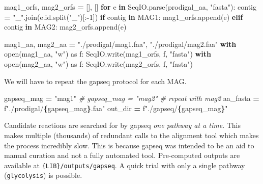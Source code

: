 \documentclass[
]{book}
\newenvironment{Shaded}{\begin{snugshade}}{\end{snugshade}}
\newcommand{\BuiltInTok}[1]{#1}
\newcommand{\CommentTok}[1]{\textcolor[rgb]{0.56,0.35,0.01}{\textit{#1}}}
\newcommand{\ControlFlowTok}[1]{\textcolor[rgb]{0.13,0.29,0.53}{\textbf{#1}}}
\newcommand{\DecValTok}[1]{\textcolor[rgb]{0.00,0.00,0.81}{#1}}
\newcommand{\ImportTok}[1]{#1}
\newcommand{\KeywordTok}[1]{\textcolor[rgb]{0.13,0.29,0.53}{\textbf{#1}}}
\newcommand{\NormalTok}[1]{#1}
\newcommand{\OperatorTok}[1]{\textcolor[rgb]{0.81,0.36,0.00}{\textbf{#1}}}
\newcommand{\SpecialCharTok}[1]{\textcolor[rgb]{0.81,0.36,0.00}{\textbf{#1}}}
\newcommand{\SpecialStringTok}[1]{\textcolor[rgb]{0.31,0.60,0.02}{#1}}
\newcommand{\StringTok}[1]{\textcolor[rgb]{0.31,0.60,0.02}{#1}}
\begin{document}
\begin{Shaded}
\begin{Highlighting}[numbers=left,,]
\NormalTok{mag1\_orfs, mag2\_orfs }\OperatorTok{=}\NormalTok{ [], []}
\ControlFlowTok{for}\NormalTok{ e }\KeywordTok{in}\NormalTok{ SeqIO.parse(prodigal\_aa, }\StringTok{"fasta"}\NormalTok{):}
\NormalTok{    contig }\OperatorTok{=} \StringTok{"\_"}\NormalTok{.join(e.}\BuiltInTok{id}\NormalTok{.split(}\StringTok{"\_"}\NormalTok{)[:}\OperatorTok{{-}}\DecValTok{1}\NormalTok{])}
    \ControlFlowTok{if}\NormalTok{ contig }\KeywordTok{in}\NormalTok{ MAG1:}
\NormalTok{        mag1\_orfs.append(e)}
    \ControlFlowTok{elif}\NormalTok{ contig }\KeywordTok{in}\NormalTok{ MAG2:}
\NormalTok{        mag2\_orfs.append(e)}

\NormalTok{mag1\_aa, mag2\_aa }\OperatorTok{=} \StringTok{"./prodigal/mag1.faa"}\NormalTok{, }\StringTok{"./prodigal/mag2.faa"}
\ControlFlowTok{with} \BuiltInTok{open}\NormalTok{(mag1\_aa, }\StringTok{"w"}\NormalTok{) }\ImportTok{as}\NormalTok{ f:}
\NormalTok{    SeqIO.write(mag1\_orfs, f, }\StringTok{"fasta"}\NormalTok{)}
\ControlFlowTok{with} \BuiltInTok{open}\NormalTok{(mag2\_aa, }\StringTok{"w"}\NormalTok{) }\ImportTok{as}\NormalTok{ f:}
\NormalTok{    SeqIO.write(mag2\_orfs, f, }\StringTok{"fasta"}\NormalTok{)}
\end{Highlighting}
\end{Shaded}

We will have to repeat the gapseq protocol for each MAG.

\begin{Shaded}
\begin{Highlighting}[numbers=left,,]
\NormalTok{gapseq\_mag }\OperatorTok{=} \StringTok{"mag1"}
\CommentTok{\# gapseq\_mag = "mag2" \# repeat with mag2}
\NormalTok{aa\_fasta }\OperatorTok{=} \SpecialStringTok{f"./prodigal/}\SpecialCharTok{\{}\NormalTok{gapseq\_mag}\SpecialCharTok{\}}\SpecialStringTok{.faa"}
\NormalTok{out\_dir }\OperatorTok{=} \SpecialStringTok{f"./gapseq/}\SpecialCharTok{\{}\NormalTok{gapseq\_mag}\SpecialCharTok{\}}\SpecialStringTok{"}
\end{Highlighting}
\end{Shaded}

Candidate reactions are searched for by gapseq \emph{one pathway at a time}. This makes multiple (thousands)
of redundant calls to the alignment tool which makes the process incredibly slow. This is because gapseq
was intended to be an aid to manual curation and not a fully automated tool.
Pre-computed outputs are available at \texttt{\{LIB\}/outputs/gapseq}. A quick trial with only a single pathway
(\texttt{glycolysis}) is possible.
\end{document}
